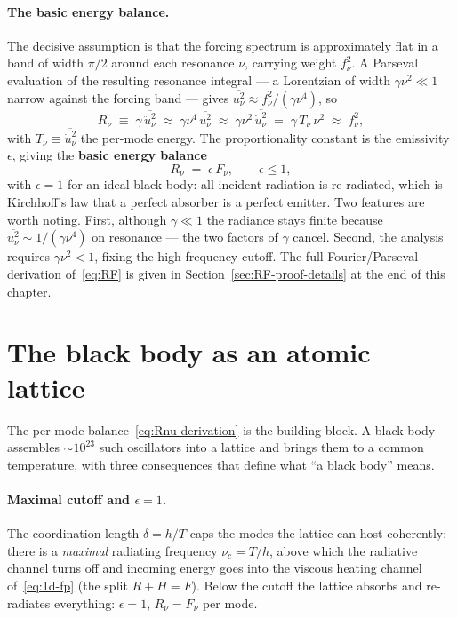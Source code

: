 \paragraph{The basic energy balance.}
The decisive assumption is that the forcing spectrum is approximately flat in a band of width $\pi/2$ around each resonance $\nu$, carrying weight $f_\nu^2$. A Parseval evaluation of the resulting resonance integral --- a Lorentzian of width $\gamma\nu^2 \ll 1$ narrow against the forcing band --- gives $\overline{u_\nu^2} \approx f_\nu^2/(\gamma\nu^4)$, so
\begin{equation}\label{eq:Rnu-derivation}
R_\nu \;\equiv\; \gamma\, \overline{\ddot u_\nu^2}
\;\approx\; \gamma\nu^4\, \overline{u_\nu^2}
\;\approx\; \gamma\nu^2\, \overline{\dot u_\nu^2}
\;=\; \gamma\, T_\nu\, \nu^2
\;\approx\; f_\nu^2,
\end{equation}
with $T_\nu \equiv \overline{\dot u_\nu^2}$ the per-mode energy. The proportionality constant is the emissivity $\epsilon$, giving the \textbf{basic energy balance}
\begin{equation}\label{eq:RF}
R_\nu \;=\; \epsilon\, F_\nu, \qquad \epsilon \le 1,
\end{equation}
with $\epsilon = 1$ for an ideal black body: all incident radiation is re-radiated, which is Kirchhoff's law that a perfect absorber is a perfect emitter. Two features are worth noting. First, although $\gamma \ll 1$ the radiance stays finite because $\overline{u_\nu^2}\sim 1/(\gamma\nu^4)$ on resonance --- the two factors of $\gamma$ cancel. Second, the analysis requires $\gamma\nu^2 < 1$, fixing the high-frequency cutoff. The full Fourier/Parseval derivation of~\eqref{eq:RF} is given in Section~\ref{sec:RF-proof-details} at the end of this chapter.

\section{The black body as an atomic lattice}\label{sec:kirchhoff}\label{sec:gamma-independence}

The per-mode balance~\eqref{eq:Rnu-derivation} is the building block. A black body assembles $\sim 10^{23}$ such oscillators into a lattice and brings them to a common temperature, with three consequences that define what ``a black body'' means.

\paragraph{Maximal cutoff and $\epsilon = 1$.}
The coordination length $\delta = h/T$ caps the modes the lattice can host coherently: there is a \emph{maximal} radiating frequency $\nu_c = T/h$, above which the radiative channel turns off and incoming energy goes into the viscous heating channel of~\eqref{eq:1d-fp} (the split $R+H=F$). Below the cutoff the lattice absorbs and re-radiates everything: $\epsilon = 1$, $R_\nu = F_\nu$ per mode.

